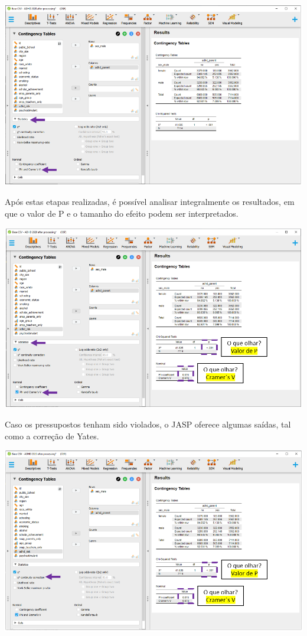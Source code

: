 \documentclass[
]{book}
\begin{document}
\includegraphics{./img/cap_x2_tamanho_do_efeito.png}

Após estas etapas realizadas, é possível analisar integralmente os
resultados, em que o valor de P e o tamanho do efeito podem ser
interpretados.

\includegraphics{./img/cap_x2_tabela.png}

Caso os pressupostos tenham sido violados, o JASP oferece algumas
saídas, tal como a correção de Yates.

\includegraphics{./img/cap_x2_yates.png}
\end{document}
